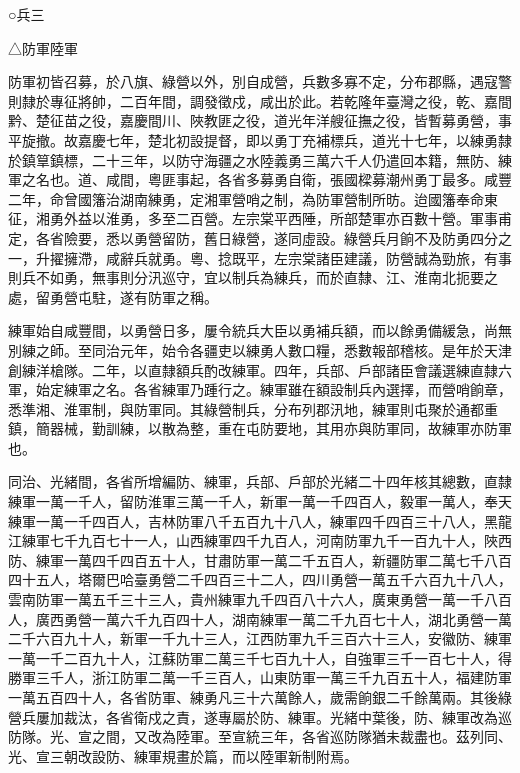 
\begin{pinyinscope}
○兵三

△防軍陸軍

防軍初皆召募，於八旗、綠營以外，別自成營，兵數多寡不定，分布郡縣，遇寇警則隸於專征將帥，二百年間，調發徵戍，咸出於此。若乾隆年臺灣之役，乾、嘉間黔、楚征苗之役，嘉慶間川、陜教匪之役，道光年洋艘征撫之役，皆暫募勇營，事平旋撤。故嘉慶七年，楚北初設提督，即以勇丁充補標兵，道光十七年，以練勇隸於鎮筸鎮標，二十三年，以防守海疆之水陸義勇三萬六千人仍遣回本籍，無防、練軍之名也。道、咸間，粵匪事起，各省多募勇自衛，張國樑募潮州勇丁最多。咸豐二年，命曾國籓治湖南練勇，定湘軍營哨之制，為防軍營制所昉。迨國籓奉命東征，湘勇外益以淮勇，多至二百營。左宗棠平西陲，所部楚軍亦百數十營。軍事甫定，各省險要，悉以勇營留防，舊日綠營，遂同虛設。綠營兵月餉不及防勇四分之一，升擢擁滯，咸辭兵就勇。粵、捻既平，左宗棠諸臣建議，防營誠為勁旅，有事則兵不如勇，無事則分汛巡守，宜以制兵為練兵，而於直隸、江、淮南北扼要之處，留勇營屯駐，遂有防軍之稱。

練軍始自咸豐間，以勇營日多，屢令統兵大臣以勇補兵額，而以餘勇備緩急，尚無別練之師。至同治元年，始令各疆吏以練勇人數口糧，悉數報部稽核。是年於天津創練洋槍隊。二年，以直隸額兵酌改練軍。四年，兵部、戶部諸臣會議選練直隸六軍，始定練軍之名。各省練軍乃踵行之。練軍雖在額設制兵內選擇，而營哨餉章，悉準湘、淮軍制，與防軍同。其綠營制兵，分布列郡汛地，練軍則屯聚於通都重鎮，簡器械，勤訓練，以散為整，重在屯防要地，其用亦與防軍同，故練軍亦防軍也。

同治、光緒間，各省所增編防、練軍，兵部、戶部於光緒二十四年核其總數，直隸練軍一萬一千人，留防淮軍三萬一千人，新軍一萬一千四百人，毅軍一萬人，奉天練軍一萬一千四百人，吉林防軍八千五百九十八人，練軍四千四百三十八人，黑龍江練軍七千九百七十一人，山西練軍四千九百人，河南防軍九千一百九十人，陜西防、練軍一萬四千四百五十人，甘肅防軍一萬二千五百人，新疆防軍二萬七千八百四十五人，塔爾巴哈臺勇營二千四百三十二人，四川勇營一萬五千六百九十八人，雲南防軍一萬五千三十三人，貴州練軍九千四百八十六人，廣東勇營一萬一千八百人，廣西勇營一萬六千九百四十人，湖南練軍一萬二千九百七十人，湖北勇營一萬二千六百九十人，新軍一千九十三人，江西防軍九千三百六十三人，安徽防、練軍一萬一千二百九十人，江蘇防軍二萬三千七百九十人，自強軍三千一百七十人，得勝軍三千人，浙江防軍二萬一千三百人，山東防軍一萬三千九百五十人，福建防軍一萬五百四十人，各省防軍、練勇凡三十六萬餘人，歲需餉銀二千餘萬兩。其後綠營兵屢加裁汰，各省衛戍之責，遂專屬於防、練軍。光緒中葉後，防、練軍改為巡防隊。光、宣之間，又改為陸軍。至宣統三年，各省巡防隊猶未裁盡也。茲列同、光、宣三朝改設防、練軍規畫於篇，而以陸軍新制附焉。


\end{pinyinscope}
